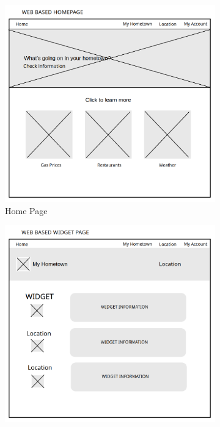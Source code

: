 \documentclass[12pt]{article}
\begin{document}
\begin{figure}[htbp]
    \begin{subfigure}[b]{0.48\textwidth}
        \centering
        \includegraphics[width=\textwidth]{images/homepage.png}
        \caption{Home Page}
    \end{subfigure}
    \hfill
    \begin{subfigure}[b]{0.48\textwidth}
        \centering
        \includegraphics[width=\textwidth]{images/widgets_page.png}

\end{subfigure}
\end{figure}
\end{document}
